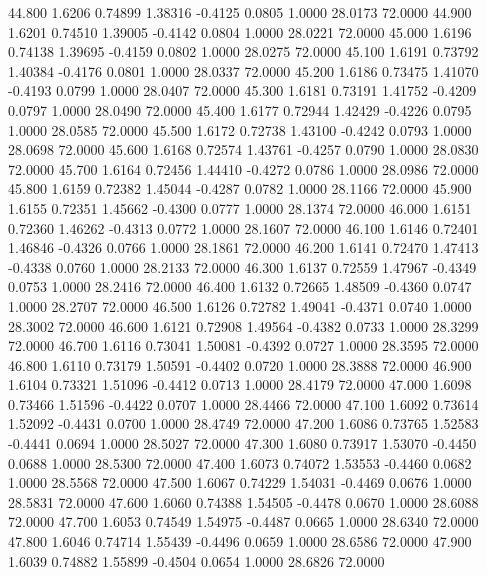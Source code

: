  44.800   1.6206   0.74899   1.38316  -0.4125   0.0805   1.0000  28.0173  72.0000
  44.900   1.6201   0.74510   1.39005  -0.4142   0.0804   1.0000  28.0221  72.0000
  45.000   1.6196   0.74138   1.39695  -0.4159   0.0802   1.0000  28.0275  72.0000
  45.100   1.6191   0.73792   1.40384  -0.4176   0.0801   1.0000  28.0337  72.0000
  45.200   1.6186   0.73475   1.41070  -0.4193   0.0799   1.0000  28.0407  72.0000
  45.300   1.6181   0.73191   1.41752  -0.4209   0.0797   1.0000  28.0490  72.0000
  45.400   1.6177   0.72944   1.42429  -0.4226   0.0795   1.0000  28.0585  72.0000
  45.500   1.6172   0.72738   1.43100  -0.4242   0.0793   1.0000  28.0698  72.0000
  45.600   1.6168   0.72574   1.43761  -0.4257   0.0790   1.0000  28.0830  72.0000
  45.700   1.6164   0.72456   1.44410  -0.4272   0.0786   1.0000  28.0986  72.0000
  45.800   1.6159   0.72382   1.45044  -0.4287   0.0782   1.0000  28.1166  72.0000
  45.900   1.6155   0.72351   1.45662  -0.4300   0.0777   1.0000  28.1374  72.0000
  46.000   1.6151   0.72360   1.46262  -0.4313   0.0772   1.0000  28.1607  72.0000
  46.100   1.6146   0.72401   1.46846  -0.4326   0.0766   1.0000  28.1861  72.0000
  46.200   1.6141   0.72470   1.47413  -0.4338   0.0760   1.0000  28.2133  72.0000
  46.300   1.6137   0.72559   1.47967  -0.4349   0.0753   1.0000  28.2416  72.0000
  46.400   1.6132   0.72665   1.48509  -0.4360   0.0747   1.0000  28.2707  72.0000
  46.500   1.6126   0.72782   1.49041  -0.4371   0.0740   1.0000  28.3002  72.0000
  46.600   1.6121   0.72908   1.49564  -0.4382   0.0733   1.0000  28.3299  72.0000
  46.700   1.6116   0.73041   1.50081  -0.4392   0.0727   1.0000  28.3595  72.0000
  46.800   1.6110   0.73179   1.50591  -0.4402   0.0720   1.0000  28.3888  72.0000
  46.900   1.6104   0.73321   1.51096  -0.4412   0.0713   1.0000  28.4179  72.0000
  47.000   1.6098   0.73466   1.51596  -0.4422   0.0707   1.0000  28.4466  72.0000
  47.100   1.6092   0.73614   1.52092  -0.4431   0.0700   1.0000  28.4749  72.0000
  47.200   1.6086   0.73765   1.52583  -0.4441   0.0694   1.0000  28.5027  72.0000
  47.300   1.6080   0.73917   1.53070  -0.4450   0.0688   1.0000  28.5300  72.0000
  47.400   1.6073   0.74072   1.53553  -0.4460   0.0682   1.0000  28.5568  72.0000
  47.500   1.6067   0.74229   1.54031  -0.4469   0.0676   1.0000  28.5831  72.0000
  47.600   1.6060   0.74388   1.54505  -0.4478   0.0670   1.0000  28.6088  72.0000
  47.700   1.6053   0.74549   1.54975  -0.4487   0.0665   1.0000  28.6340  72.0000
  47.800   1.6046   0.74714   1.55439  -0.4496   0.0659   1.0000  28.6586  72.0000
  47.900   1.6039   0.74882   1.55899  -0.4504   0.0654   1.0000  28.6826  72.0000

